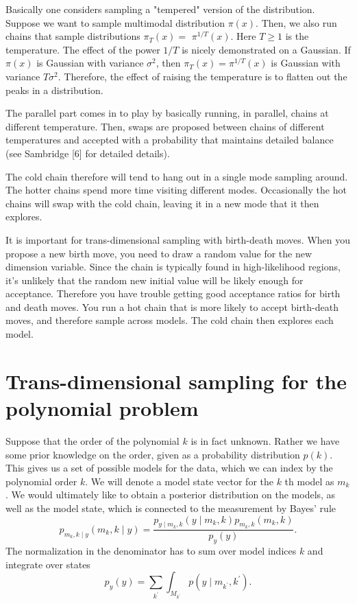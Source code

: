 \documentclass[11pt]{article}
\begin{document}
Basically one considers sampling a "tempered" version of the distribution. Suppose we want to sample multimodal distribution $\pi(x)$. Then, we also run chains that sample distributions $\pi_{T}(x)=$ $\pi^{1 / T}(x)$. Here $T \geq 1$ is the temperature. The effect of the power $1 / T$ is nicely demonstrated on a Gaussian. If $\pi(x)$ is Gaussian with variance $\sigma^{2}$, then $\pi_{T}(x)=\pi^{1 / T}(x)$ is Gaussian with variance $T \sigma^{2}$. Therefore, the effect of raising the temperature is to flatten out the peaks in a distribution.

The parallel part comes in to play by basically running, in parallel, chains at different temperature. Then, swaps are proposed between chains of different temperatures and accepted with a probability that maintains detailed balance (see Sambridge [6] for detailed details).

The cold chain therefore will tend to hang out in a single mode sampling around. The hotter chains spend more time visiting different modes. Occasionally the hot chains will swap with the cold chain, leaving it in a new mode that it then explores.

It is important for trans-dimensional sampling with birth-death moves. When you propose a new birth move, you need to draw a random value for the new dimension variable. Since the chain is typically found in high-likelihood regions, it's unlikely that the random new initial value will be likely enough for acceptance. Therefore you have trouble getting good acceptance ratios for birth and death moves. You run a hot chain that is more likely to accept birth-death moves, and therefore sample across models. The cold chain then explores each model.

\section{Trans-dimensional sampling for the polynomial problem}

Suppose that the order of the polynomial $k$ is in fact unknown. Rather we have some prior knowledge on the order, given as a probability distribution $p(k)$. This gives us a set of possible models for the data, which we can index by the polynomial order $k$. We will denote a model state vector for the $k$ th model as $m_{k}$. We would ultimately like to obtain a posterior distribution on the models, as well as the model state, which is connected to the measurement by Bayes' rule
\begin{equation}
p_{m_{k}, k \mid y}\left(m_{k}, k \mid y\right)=\frac{p_{y \mid m_{k}, k}\left(y \mid m_{k}, k\right) p_{m_{k}, k}\left(m_{k}, k\right)}{p_{y}(y)} .
\end{equation}
The normalization in the denominator has to sum over model indices $k$ and integrate over states
\begin{equation}
p_{y}(y)=\sum_{k^{\prime}} \int_{M_{k^{\prime}}} p\left(y \mid m_{k^{\prime}}, k^{\prime}\right)
. \end{equation}
\end{document}
